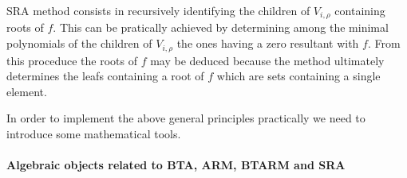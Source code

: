\documentclass{article}
\newcommand{\qq}{q}
\newcommand{\nn}{n}
\begin{document}
\medskip
 
SRA method consists in recursively identifying the children of $V_{i,\rho}$ containing roots of $f$. 
This can be pratically achieved by determining among the minimal polynomials of the children of 
$V_{i,\rho}$ the ones having a zero resultant with $f$. %
From this proceduce the roots of $f$ may be deduced because the method ultimately determines the leafs containing a root of $f$ which are sets containing a single element.



In order to implement the above general principles practically we need to introduce some 
mathematical tools.


\paragraph{Algebraic objects related to BTA, ARM, BTARM and SRA}
\end{document}
